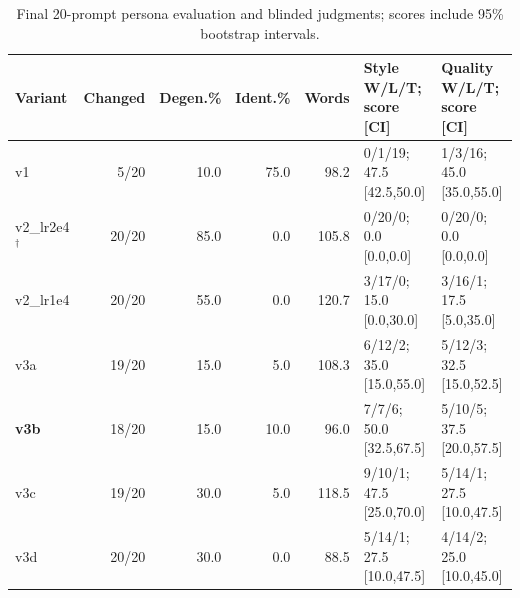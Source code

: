 \begin{table}[H]\centering\footnotesize\caption{Final 20-prompt persona evaluation and blinded judgments; scores include 95\% bootstrap intervals.}\label{tab:persona-final}\setlength{\tabcolsep}{3pt}\begin{tabularx}{\textwidth}{lrrrrXX}\toprule Variant&Changed&Degen.\%&Ident.\%&Words&Style W/L/T; score [CI]&Quality W/L/T; score [CI]\\\midrule
v1&5/20&10.0&75.0&98.2&0/1/19; 47.5 [42.5,50.0]&1/3/16; 45.0 [35.0,55.0]\\
v2\_lr2e4$^\dagger$&20/20&85.0&0.0&105.8&0/20/0; 0.0 [0.0,0.0]&0/20/0; 0.0 [0.0,0.0]\\
v2\_lr1e4&20/20&55.0&0.0&120.7&3/17/0; 15.0 [0.0,30.0]&3/16/1; 17.5 [5.0,35.0]\\
v3a&19/20&15.0&5.0&108.3&6/12/2; 35.0 [15.0,55.0]&5/12/3; 32.5 [15.0,52.5]\\
\textbf{v3b}&18/20&15.0&10.0&96.0&7/7/6; 50.0 [32.5,67.5]&5/10/5; 37.5 [20.0,57.5]\\
v3c&19/20&30.0&5.0&118.5&9/10/1; 47.5 [25.0,70.0]&5/14/1; 27.5 [10.0,47.5]\\
v3d&20/20&30.0&0.0&88.5&5/14/1; 27.5 [10.0,47.5]&4/14/2; 25.0 [10.0,45.0]\\
\bottomrule\end{tabularx}\end{table}
